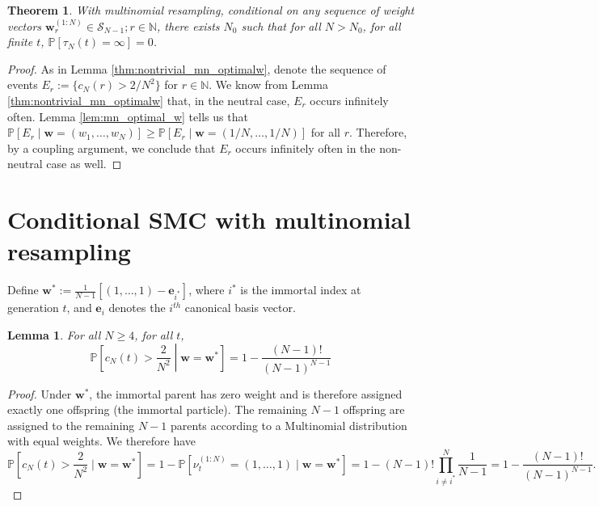 \documentclass{article}
\newtheorem{thm}{Theorem}
\newtheorem{lemma}{Lemma}
\newcommand{\PR}{\mathbb{P}}
\begin{document}
\begin{thm}
With multinomial resampling, conditional on any sequence of weight vectors $\mathbf{w}_r^{(1:N)} \in \mathcal{S}_{N-1}; r\in\mathbb{N}$, there exists $N_0$ such that for all $N>N_0$, for all finite $t$, $\PR[\tau_N(t) = \infty] =0$.
\end{thm}

\begin{proof}
As in Lemma \ref{thm:nontrivial_mn_optimalw}, denote the sequence of events 
$E_r := \{ c_N(r) > 2/N^2 \}$ for $r \in \mathbb{N}$.
We know from Lemma \ref{thm:nontrivial_mn_optimalw} that, in the neutral case, $E_r$ occurs infinitely often. Lemma \ref{lem:mn_optimal_w} tells us that 
$\PR[E_r \mid \mathbf{w}=(w_1, \dots, w_N)] \geq \PR[E_r \mid \mathbf{w}=(1/N, \dots, 1/N)]$
for all $r$. 
Therefore, by a coupling argument, we conclude that $E_r$ occurs infinitely often in the non-neutral case as well.
\end{proof}


\section*{Conditional SMC with multinomial resampling}

Define $\mathbf{w}^* := \frac{1}{N-1} \left[ (1,\dots,1) - \mathbf{e}_{i^*} \right]$, where $i^*$ is the immortal index at generation $t$, and $\mathbf{e}_i$ denotes the $i^{th}$ canonical basis vector.
 
\begin{lemma}\label{lem:csmc_cN_LB}
For all $N\geq 4$, for all $t$,
\begin{equation*}
\PR \left[c_N(t) > \frac{2}{N^2} \middle| \mathbf{w}=\mathbf{w}^*  \right] 
= 1- \frac{(N-1)!}{(N-1)^{N-1}}
\end{equation*}
\end{lemma}

\begin{proof}
Under $\mathbf{w}^*$, the immortal parent has zero weight and is therefore assigned exactly one offspring (the immortal particle). The remaining $N-1$ offspring are assigned to the remaining $N-1$ parents according to a Multinomial distribution with equal weights. We therefore have
\begin{equation*}
\PR \left[c_N(t) > \frac{2}{N^2} \mid \mathbf{w}=\mathbf{w}^* \right]
= 1-\PR[\nu_t^{(1:N)} = (1,\dots, 1) \mid \mathbf{w}=\mathbf{w}^*] 
= 1- (N-1)! \prod_{i\neq i^*}^{N} \frac{1}{N-1}
= 1- \frac{(N-1)!}{(N-1)^{N-1}} .
\end{equation*}
\end{proof} 
\end{document}

